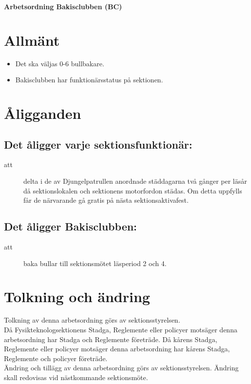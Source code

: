 \renewcommand{\dateseparator}{-} %

\renewcommand{\forening}{Bakisclubben}

\begin{center}
\LARGE{\textbf{Arbetsordning Bakisclubben (BC)}}
\end{center}


\section{Allmänt}
\begin{itemize}


\item Det ska väljas 0-6 bullbakare.

\item Bakisclubben har funktionärsstatus på sektionen.


\end{itemize}


\section{Åligganden}
\subsection{Det åligger varje sektionsfunktionär:}
    \begin{description}
      \item[att] delta i de av Djungelpatrullen anordnade städdagarna två gånger per
      läsår då sektionslokalen och sektionens motorfordon städas. Om detta uppfylls får de närvarande gå gratis på nästa
      sektionsaktivafest.
    \end{description}
    
\subsection{Det åligger Bakisclubben:}
\begin{description}
      \item[att] baka bullar till sektionsmötet läsperiod 2 och 4. 
      
\end{description}

\section{Tolkning och ändring}
Tolkning av denna arbetsordning görs av sektionsstyrelsen.\\ Då Fysikteknologsektionens Stadga, Reglemente eller policyer motsäger denna arbetsordning har Stadga och Reglemente företräde. Då kårens Stadga, Reglemente eller policyer motsäger denna arbetsordning har kårens Stadga, Reglemente och policyer företräde.\\
Ändring och tillägg av denna arbetsordning görs av sektionsstyrelsen. Ändring skall redovisas vid nästkommande sektionsmöte. 

\newpage 
 